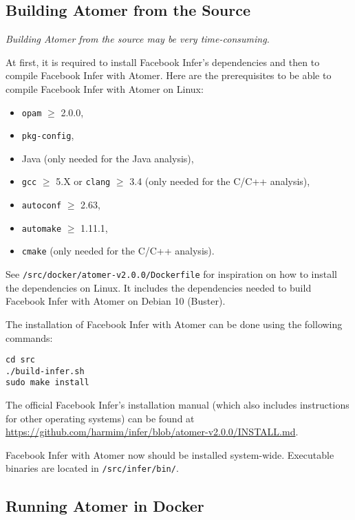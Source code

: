\subsection*{Building Atomer from the Source}

\textit{Building Atomer from the source may be very time-consuming.}

At first, it is required to install Facebook Infer's dependencies and then to compile Facebook Infer with Atomer. Here are the prerequisites to be able to compile Facebook Infer with Atomer on Linux:
\begin{itemize}
    \item \texttt{opam} $ \geq $ 2.0.0,
    
    \item \texttt{pkg-config},
    
    \item Java (only needed for the Java analysis),
    
    \item \texttt{gcc} $ \geq $ 5.X or \texttt{clang} $ \geq $ 3.4 (only needed for the C/C++ analysis),
    
    \item \texttt{autoconf} $ \geq $ 2.63,
    
    \item \texttt{automake} $ \geq $ 1.11.1,
    
    \item \texttt{cmake} (only needed for the C/C++ analysis).
\end{itemize}
See \texttt{/src/docker/atomer-v2.0.0/Dockerfile} for inspiration on how to install the dependencies on Linux. It includes the dependencies needed to build Facebook Infer with Atomer on Debian 10 (Buster).

The installation of Facebook Infer with Atomer can be done using the following commands:
\begin{lstlisting}[style=bash]
cd src
./build-infer.sh
sudo make install
\end{lstlisting}
The official Facebook Infer's installation manual (which also includes instructions for other operating systems) can be found at \url{https://github.com/harmim/infer/blob/atomer-v2.0.0/INSTALL.md}.

Facebook Infer with Atomer now should be installed system-wide. Executable binaries are located in \texttt{/src/infer/bin/}.

\subsection*{Running Atomer in Docker}

